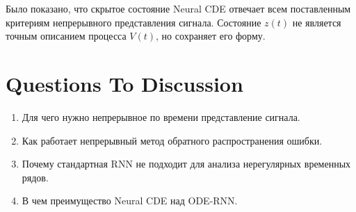 Было показано, что скрытое состояние Neural CDE отвечает всем поставленным критериям непрерывного представления сигнала. Состояние $z(t)$ не является точным описанием процесса $V(t)$, но сохраняет его форму.
	
\begin{figure}[ht]%
    \centering
    \qquad
\end{figure}

\section{Questions To Discussion}
\begin{enumerate}
    \item Для чего нужно непрерывное по времени представление сигнала.
    \item Как работает непрерывный метод обратного распространения ошибки.
    \item Почему стандартная RNN не подходит для анализа нерегулярных временных рядов.
    \item В чем преимущество Neural CDE над ODE-RNN.
\end{enumerate}